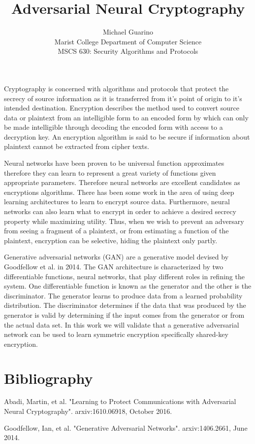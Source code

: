 \documentclass[12pt]{article}
\begin{document}
\title{Adversarial Neural Cryptography}
\author{Michael Guarino\\
        Marist College Department of Computer Science\\
        MSCS 630: Security Algorithms and Protocols}
\maketitle
\begin{proposal}

Cryptography is concerned with algorithms and protocols that protect the secrecy of source information as it is transferred from it's point of origin to it's intended destination. Encryption describes the method used to convert source data or plaintext from an intelligible form to an encoded form by which can only be made intelligible through decoding the encoded form with access to a decryption key. An encryption algorithm is said to be secure if information about plaintext cannot be extracted from cipher texts.

Neural networks have been proven to be universal function approximates therefore they can learn to represent a great variety of functions given appropriate parameters. Therefore neural networks are excellent candidates as encryptions algorithms. There has been some work in the area of using deep learning architectures to learn to encrypt source data. Furthermore, neural networks can also learn what to encrypt in order to achieve a desired secrecy property while maximizing utility. Thus, when we wish to prevent an adversary from seeing a 
fragment of a plaintext, or from estimating a function of the plaintext, encryption can be selective, hiding the plaintext only partly. 

Generative adversarial networks (GAN) are a generative model devised by Goodfellow et al. in 2014. The GAN architecture is characterized by two differentiable functions, neural networks, that play different roles in refining the system. One differentiable function is known as the generator and the other is the discriminator. The generator learns to produce data from a learned probability distribution. The discriminator determines if the data that was produced by the generator is valid by determining if the input comes from the generator or from the actual data set. In this work we will validate that a generative adversarial network can be used to learn symmetric encryption specifically shared-key encryption.

\end{proposal}

\section{Bibliography}

Abadi, Martin, et al. "Learning to Protect Communications with Adversarial Neural Cryptography". arxiv:1610.06918, October 2016.
\newline

Goodfellow, Ian, et al. "Generative Adversarial Networks". arxiv:1406.2661, June 2014.
\newline
\end{document}
